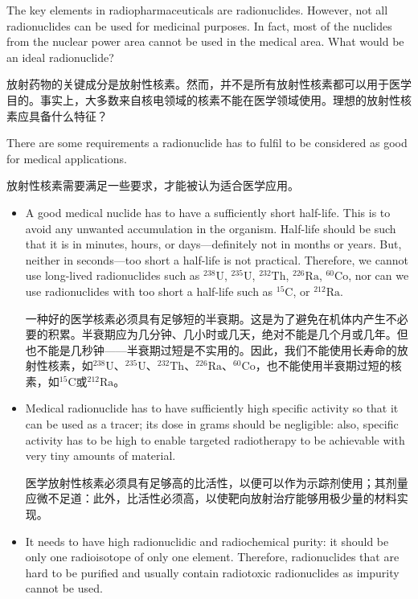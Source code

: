 \documentclass[dvipsnames, svgnames,a4paper,11pt]{article}
\begin{document}
The key elements in radiopharmaceuticals are radionuclides. However, not all radionuclides can be used for medicinal purposes. In fact, most of the nuclides from the nuclear power area cannot be used in the medical area. What would be an ideal radionuclide?

放射药物的关键成分是放射性核素。然而，并不是所有放射性核素都可以用于医学目的。事实上，大多数来自核电领域的核素不能在医学领域使用。理想的放射性核素应具备什么特征？

There are some requirements a radionuclide has to fulfil to be considered as good for medical applications.

放射性核素需要满足一些要求，才能被认为适合医学应用。

\begin{itemize}


      \item A good medical nuclide has to have a sufficiently short half-life. This is to avoid any unwanted accumulation in the organism. Half-life should be such that it is in minutes, hours, or days—definitely not in months or years. But, neither in seconds—too short a half-life is not practical. Therefore, we cannot use long-lived radionuclides such as \(\mathrm{^{238}U}\), \(\mathrm{^{235}U}\), \(\mathrm{^{232}Th}\), \(\mathrm{^{226}Ra}\), \(\mathrm{^{60}Co}\), nor can we use radionuclides with too short a half-life such as \(\mathrm{^{15}C}\), or \(\mathrm{^{212}Ra}\).


            一种好的医学核素必须具有足够短的半衰期。这是为了避免在机体内产生不必要的积累。半衰期应为几分钟、几小时或几天，绝对不能是几个月或几年。但也不能是几秒钟——半衰期过短是不实用的。因此，我们不能使用长寿命的放射性核素，如${}^\text{238}\text{U}$、${}^\text{235}\text{U}$、${}^\text{232}\text{Th}$、${}^\text{226}\text{Ra}$、${}^\text{60}\text{Co}$，也不能使用半衰期过短的核素，如${}^\text{15}\text{C}$或${}^\text{212}\text{Ra}$。


      \item Medical radionuclide has to have sufficiently high specific activity so that it can be used as a tracer; its dose in grams should be negligible: also, specific activity has to be high to enable targeted radiotherapy to be achievable with very tiny amounts of material.

            医学放射性核素必须具有足够高的比活性，以便可以作为示踪剂使用；其剂量应微不足道：此外，比活性必须高，以使靶向放射治疗能够用极少量的材料实现。

      \item It needs to have high radionuclidic and radiochemical purity: it should be only one radioisotope of only one element. Therefore, radionuclides that are hard to be purified and usually contain radiotoxic radionuclides as impurity cannot be used.


\end{itemize}
\end{document}
